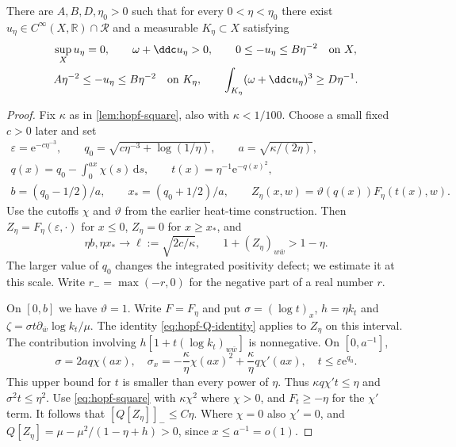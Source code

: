 \begin{theorem}\label{thm:rotational-depth-core}
There are $A,B,D,\eta_0>0$ such that for every $0<\eta<\eta_0$ there exist
$u_\eta\in C^\infty(X,\mathbb R)\cap\mathcal R$ and a measurable $K_\eta\subset X$ satisfying
\begin{gather*}
 \sup_Xu_\eta=0,\qquad \omega+\ddc u_\eta>0,
 \qquad 0\leq-u_\eta\leq B\eta^{-2}\quad\text{on }X,\\
 A\eta^{-2}\leq-u_\eta\leq B\eta^{-2}\quad\text{on }K_\eta,
 \qquad
 \int_{K_\eta}(\omega+\ddc u_\eta)^3\geq D\eta^{-1}.
\end{gather*}
\end{theorem}
\begin{proof}
Fix $\kappa$ as in \cref{lem:hopf-square}, also with $\kappa<1/100$. Choose a small fixed $c>0$
later and set
\begin{gather*}
 \varepsilon=\mathrm e^{-c\eta^{-3}},\qquad
 q_0=\sqrt{c\eta^{-3}+\log(1/\eta)},\qquad
 a=\sqrt{\kappa/(2\eta)},\\
 q(x)=q_0-\int_0^{ax}\chi(s)\,\mathrm ds,\qquad
 t(x)=\eta^{-1}\mathrm e^{-q(x)^2},\\
 b=(q_0-1/2)/a,\qquad x_*=(q_0+1/2)/a,\qquad
 Z_\eta(x,w)=\vartheta(q(x))F_\eta(t(x),w).
\end{gather*}
Use the cutoffs $\chi$ and $\vartheta$ from the earlier heat-time construction. Then $Z_\eta=F_\eta(\varepsilon,\cdot)$ for
$x\leq0$, $Z_\eta=0$ for $x\geq x_*$, and
\[
 \eta b,\eta x_*\longrightarrow\ell:=\sqrt{2c/\kappa},\qquad
 1+(Z_\eta)_{w\bar w}>1-\eta.
\]
The larger value of $q_0$ changes the integrated positivity defect; we estimate it at this scale. Write $r_-=\max(-r,0)$ for the negative part of a real number $r$.

On $[0,b]$ we have $\vartheta=1$.
Write $F=F_\eta$ and put $\sigma=(\log t)_x$, $h=\eta k_t$ and $\zeta=\sigma t\partial_{\bar w}\log k_t/\mu$. The identity \eqref{eq:hopf-Q-identity} applies to $Z_\eta$ on this interval.
The contribution involving $h[1+t(\log k_t)_{w\bar w}]$ is nonnegative.
On $[0,a^{-1}]$,
\[
 \sigma=2aq\chi(ax),\quad
 \sigma_x=-\frac\kappa\eta\chi(ax)^2+\frac\kappa\eta q\chi'(ax),
 \quad t\leq\varepsilon\mathrm e^{q_0}.
\]
This upper bound for $t$ is smaller than every power of $\eta$.
Thus $\kappa q\chi't\leq\eta$ and $\sigma^2t\leq\eta^2$.
Use \eqref{eq:hopf-square} with $\kappa\chi^2$ where $\chi>0$, and $F_t\geq-\eta$
for the $\chi'$ term. It follows that $[Q[Z_\eta]]_-\leq C\eta$.
Where $\chi=0$ also $\chi'=0$, and
$Q[Z_\eta]=\mu-\mu^2/(1-\eta+h)>0$, since $x\leq a^{-1}=o(1)$.


\end{proof}
